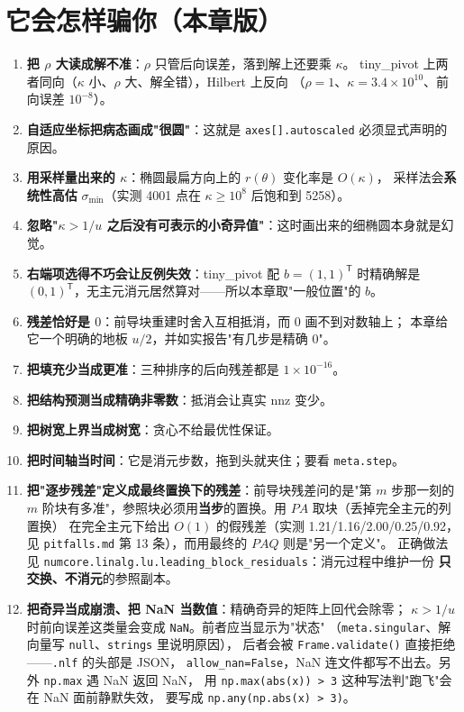 

\section{它会怎样骗你（本章版）}

\begin{enumerate}
  \item \textbf{把 $\rho$ 大读成解不准}：$\rho$ 只管后向误差，落到解上还要乘 $\kappa$。
        tiny\_pivot 上两者同向（$\kappa$ 小、$\rho$ 大、解全错），Hilbert 上反向
        （$\rho=1$、$\kappa=3.4\times10^{10}$、前向误差 $10^{-8}$）。
  \item \textbf{自适应坐标把病态画成"很圆"}：这就是 \texttt{axes[].autoscaled} 必须显式声明的原因。
  \item \textbf{用采样量出来的 $\kappa$}：椭圆最扁方向上的 $r(\theta)$ 变化率是 $O(\kappa)$，
        采样法会\textbf{系统性高估} $\sigma_{\min}$（实测 4001 点在 $\kappa\ge10^8$ 后饱和到 5258）。
  \item \textbf{忽略"$\kappa>1/u$ 之后没有可表示的小奇异值"}：这时画出来的细椭圆本身就是幻觉。
  \item \textbf{右端项选得不巧会让反例失效}：tiny\_pivot 配 $b=(1,1)^{\mathsf T}$ 时精确解是
        $(0,1)^{\mathsf T}$，无主元消元居然算对——所以本章取"一般位置"的 $b$。
  \item \textbf{残差恰好是 $0$}：前导块重建时舍入互相抵消，而 $0$ 画不到对数轴上；
        本章给它一个明确的地板 $u/2$，并如实报告"有几步是精确 $0$"。
  \item \textbf{把填充少当成更准}：三种排序的后向残差都是 $1\times10^{-16}$。
  \item \textbf{把结构预测当成精确非零数}：抵消会让真实 $\mathrm{nnz}$ 变少。
  \item \textbf{把树宽上界当成树宽}：贪心不给最优性保证。
  \item \textbf{把时间轴当时间}：它是消元步数，拖到头就夹住；要看 \texttt{meta.step}。
  \item \textbf{把"逐步残差"定义成最终置换下的残差}：前导块残差问的是"第 $m$ 步那一刻的
        $m$ 阶块有多准"，参照块必须用\textbf{当步}的置换。用 $PA$ 取块（丢掉完全主元的列置换）
        在完全主元下给出 $O(1)$ 的假残差（实测 1.21/1.16/2.00/0.25/0.92，见
        \texttt{pitfalls.md} 第 13 条），而用最终的 $PAQ$ 则是"另一个定义"。
        正确做法见 \texttt{numcore.linalg.lu.leading\_block\_residuals}：消元过程中维护一份
        \textbf{只交换、不消元}的参照副本。
  \item \textbf{把奇异当成崩溃、把 NaN 当数值}：精确奇异的矩阵上回代会除零；
        $\kappa>1/u$ 时前向误差这类量会变成 \texttt{NaN}。前者应当显示为"状态"
        （\texttt{meta.singular}、解向量写 \texttt{null}、\texttt{strings} 里说明原因），
        后者会被 \texttt{Frame.validate()} 直接拒绝——\texttt{.nlf} 的头部是 JSON，
        \texttt{allow\_nan=False}，NaN 连文件都写不出去。另外 \texttt{np.max} 遇 NaN 返回 NaN，
        用 \texttt{np.max(abs(x)) > 3} 这种写法判"跑飞"会在 NaN 面前静默失效，
        要写成 \texttt{np.any(np.abs(x) > 3)}。
\end{enumerate}
